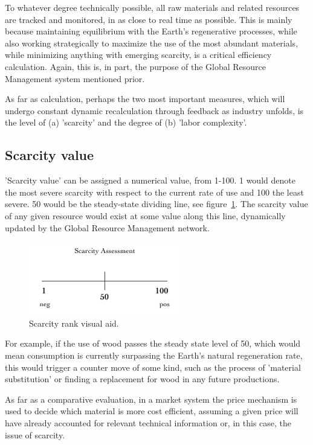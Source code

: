 \documentclass[10pt, a4paper, cleardoubleempty, openright, twoside]{book}
\begin{document}
To whatever degree technically possible, all raw materials and related
resources are tracked and monitored, in as close to real time as
possible. This is mainly because maintaining equilibrium with the
Earth's regenerative processes, while also working strategically to
maximize the use of the most abundant materials, while minimizing
anything with emerging scarcity, is a critical efficiency calculation.
Again, this is, in part, the purpose of the Global Resource Management
system mentioned prior. 

As far as  calculation, perhaps the two most important measures, which will undergo constant dynamic recalculation through feedback as industry unfolds, is the level of (a) 'scarcity' and the degree of (b) 'labor complexity'. 

\subsection {Scarcity value}
'Scarcity value' can be assigned a numerical value, from 1-100. 1 would
denote the most severe scarcity with respect to the current rate of use
and 100 the least severe. 50 would be the steady-state dividing line,
see figure~\ref{fig:scarcity}.  The scarcity value of any given resource
would exist at some value along this line, dynamically updated by the
Global Resource Management network. 
	
\begin{figure}[bt!]
	\centering
	\includegraphics[width=0.6\textwidth]{figures/scarcity.pdf}
	\caption {Scarcity rank visual aid.}
	\label{fig:scarcity}
\end{figure}

For example, if the use of wood passes the steady state level of 50,
which would mean consumption is currently surpassing the Earth's natural
regeneration rate, this would trigger a counter move of some kind, such
as the process of 'material substitution' or finding a replacement for
wood in any future productions. 

As far as a comparative evaluation, in a market system the price
mechanism is used to decide which material is more cost efficient,
assuming a given price will have already accounted for relevant
technical information or, in this case, the issue of scarcity.
\end{document}
